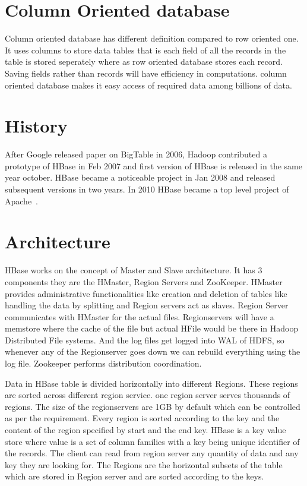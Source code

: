 \section{Column Oriented database}

Column oriented database has different definition compared to row oriented one. 
It uses columns to store data tables that is each field of all the records in 
the table is stored  seperately where as row oriented database stores each 
record. Saving fields rather than records will have efficiency in computations.
column oriented database makes it easy access of required data among billions of 
data. 

\section{History}

 After Google released paper on BigTable in 2006, Hadoop contributed a prototype
of HBase in Feb 2007 and first version of HBase is released in the same year 
october. HBase became a noticeable project in Jan 2008 and released subsequent 
versions in two years. In 2010 HBase became a top level project of 
Apache~\cite{hid-sp18-421-HBase-history}.

\section{Architecture}

HBase works on the concept of Master and Slave architecture. It has 3
components they are the HMaster, Region Servers and ZooKeeper.   HMaster
provides administrative functionalities like creation and deletion of tables
like handling the data by splitting and Region servers act as slaves. Region
Server communicates with HMaster for the actual files. Regionservers will have a
memstore where the cache of the file but actual HFile  would be there in Hadoop
Distributed File systems. And the log files get logged  into WAL of HDFS, so
whenever any of the Regionserver goes down we can rebuild  everything using the
log file. Zookeeper performs distribution coordination.

 Data in HBase table is divided horizontally into different Regions. These 
regions are sorted across different region service. one region server serves 
thousands of regions. The size of the regionservers are 1GB by default which 
can be controlled as per the requirement. Every region is sorted according to 
the key and the content of the region specified by start and the end key. HBase
is a key value store where value is a set of column families with a key being 
unique identifier of the records. The client can read from region server any 
quantity of data and any key they are looking for. The Regions are the horizontal
subsets of the table which are stored in Region server and are sorted according 
to the keys. 

